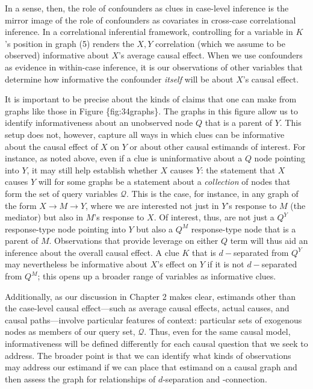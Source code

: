 \documentclass[12pt,]{book}
\begin{document}
In a sense, then, the role of confounders as clues in case-level inference is the mirror image of the role of confounders as covariates in cross-case correlational inference. In a correlational inferential framework, controlling for a variable in \(K\)'s position in graph (5) renders the \(X, Y\) correlation (which we assume to be observed) informative about \(X\)'s average causal effect. When we use confounders as evidence in within-case inference, it is our observations of other variables that determine how informative the confounder \emph{itself} will be about \(X\)'s causal effect.

It is important to be precise about the kinds of claims that one can make from graphs like those in Figure \{fig:34graphs\}. The graphs in this figure allow us to identify informativeness about an unobserved node \(Q\) that is a parent of \(Y\). This setup does not, however, capture all ways in which clues can be informative about the causal effect of \(X\) on \(Y\) or about other causal estimands of interest. For instance, as noted above, even if a clue is uninformative about a \(Q\) node pointing into \(Y\), it may still help establish whether \(X\) causes \(Y\): the statement that \(X\) causes \(Y\) will for some graphs be a statement about a \emph{collection} of nodes that form the set of query variables \(\mathcal Q\). This is the case, for instance, in any graph of the form \(X \rightarrow M \rightarrow Y\), where we are interested not just in \(Y\)'s response to \(M\) (the mediator) but also in \(M\)'s response to \(X\). Of interest, thus, are not just a \(Q^Y\) response-type node pointing into \(Y\) but also a \(Q^M\) response-type node that is a parent of \(M\). Observations that provide leverage on either \(Q\) term will thus aid an inference about the overall causal effect. A clue \(K\) that is \(d-\)separated from \(Q^Y\) may nevertheless be informative about \(X\)'s effect on \(Y\) if it is not \(d-\)separated from \(Q^M\); this opens up a broader range of variables as informative clues.

Additionally, as our discussion in Chapter 2 makes clear, estimands other than the case-level causal effect---such as average causal effects, actual causes, and causal paths---involve particular features of context: particular sets of exogenous nodes as members of our query set, \(\mathcal Q\). Thus, even for the same causal model, informativeness will be defined differently for each causal question that we seek to address. The broader point is that we can identify what kinds of observations may address our estimand if we can place that estimand on a causal graph and then assess the graph for relationships of \(d\)-separation and -connection.
\end{document}
